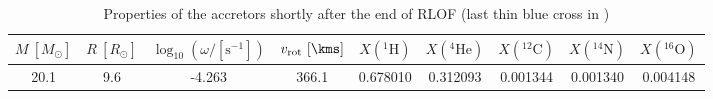 
    \begin{table*}[hbpt]
    \centering
    \begin{tabular}{c|c|c|c|c|c|c|c|c}
    \hline\hline
    $M \ [M_\odot]$ & $R\ [R_\odot]$ & $\log_{10}(\omega / [\mathrm{s^{-1}}])$ & $v_\mathrm{rot} \ [\kms] $ & $X(^{1}\mathrm{H})$ & $X(^{4}\mathrm{He})$ & $X(^{12}\mathrm{C})$ & $X(^{14}\mathrm{N})$ & $X(^{16}\mathrm{O})$ \\
    \hline
    20.1 & 9.6 & -4.263 & 366.1 & 0.678010 & 0.312093 & 0.001344 & 0.001340 & 0.004148 \\
    \hline
    \end{tabular}
    \caption{Properties of the accretors shortly after the end of RLOF
    (last thin blue cross in )}
    \label{tab:surf_prop}
    \end{table*}
    
